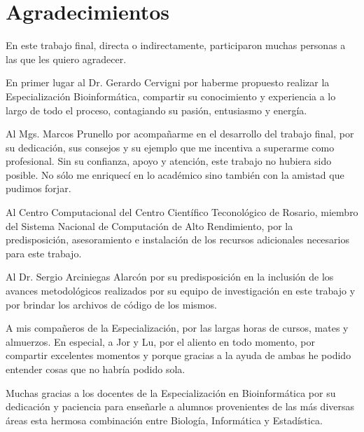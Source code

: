 
\chapter*{Agradecimientos}


En este trabajo final, directa o indirectamente, participaron muchas personas a las que les quiero agradecer.

En primer lugar al Dr. Gerardo Cervigni por haberme propuesto realizar la Especialización Bioinformática, compartir su conocimiento y experiencia a lo largo de todo el proceso, contagiando su pasión, entusiasmo y energía. 

Al Mgs. Marcos Prunello por acompañarme en el desarrollo del trabajo final, por su dedicación, sus consejos y su ejemplo que me incentiva a superarme como profesional. Sin su confianza, apoyo y atención, este trabajo no hubiera sido posible. No sólo me enriquecí en lo académico sino también con la amistad que pudimos forjar. 

Al Centro Computacional del Centro Científico Teconológico de Rosario, miembro del Sistema Nacional de Computación de Alto Rendimiento, por la predisposición, asesoramiento e instalación de los recursos adicionales necesarios para este trabajo. 

Al Dr. Sergio Arciniegas Alarcón por su predisposición en la inclusión de los avances metodológicos realizados por su equipo de investigación en este trabajo y por brindar los archivos de código de los mismos.

A mis compañeros de la Especialización, por las largas horas de cursos, mates y almuerzos. En especial, a Jor y Lu, por el aliento en todo momento, por compartir excelentes momentos y porque gracias a la ayuda de ambas he podido entender cosas que no habría podido sola.

Muchas gracias a los docentes de la Especialización en Bioinformática por su dedicación y paciencia para enseñarle a alumnos provenientes de las más diversas áreas esta hermosa combinación entre Biología, Informática y Estadística.

